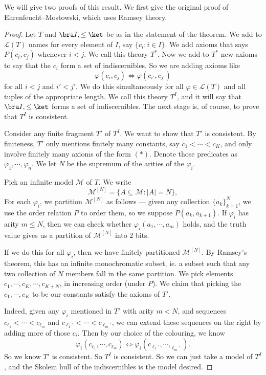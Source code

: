 \documentclass[a4paper]{article}
\begin{document}
We will give two proofs of this result. We first give the original proof of Ehrenfeucht--Mostowski, which uses Ramsey theory.
\begin{proof}
  Let $T$ and $\bra I, \leq \ket$ be as in the statement of the theorem. We add to $\mathcal{L}(T)$ names for every element of $I$, say $\{c_i: i \in I\}$. We add axioms that says $P(c_i, c_j)$ whenever $i < j$. We call this theory $T^*$. Now we add to $T^*$ new axioms to say that the $c_i$ form a set of indiscernibles. So we are adding axioms like
  \[
    \varphi(c_i, c_j) \Leftrightarrow \varphi(c_{i'}, c_{j'})\tag{$*$}
  \]
  for all $i < j$ and $i' < j'$. We do this simultaneously for all $\varphi \in \mathcal{L}(T)$ and all tuples of the appropriate length. We call this theory $T^I$, and it will say that $\bra I, \leq\ket$ forms a set of indiscernibles. The next stage is, of course, to prove that $T^I$ is consistent.

  Consider any finite fragment $T'$ of $T^I$. We want to show that $T'$ is consistent. By finiteness, $T'$ only mentions finitely many constants, say $c_1 < \cdots < c_K$, and only involve finitely many axioms of the form $(*)$. Denote those predicates as $\varphi_1, \cdots, \varphi_n$. We let $N$ be the supremum of the arities of the $\varphi_i$.

  Pick an infinite model $\mathcal{M}$ of $T$. We write
  \[
    \mathcal{M}^{[N]} = \{A \subseteq \mathcal{M}: |A| = N\},
  \]
  For each $\varphi_i$, we partition $\mathcal{M}^{[N]}$ as follows --- given any collection $\{a_k\}_{k = 1}^N$, we use the order relation $P$ to order them, so we suppose $P(a_k , a_{k + 1})$. If $\varphi_i$ has arity $m \leq N$, then we can check whether $\varphi_i(a_1, \cdots, a_m)$ holds, and the truth value gives us a partition of $\mathcal{M}^{[N]}$ into 2 bits.

  If we do this for all $\varphi_i$, then we have finitely partitioned $\mathcal{M}^{[N]}$. By Ramsey's theorem, this has an infinite monochromatic subset, ie. a subset such that any two collection of $N$ members fall in the same partition. We pick elements $c_1, \cdots, c_K, \cdots, c_{K + N}$, in increasing order (under $P$). We claim that picking the $c_1, \cdots, c_K$ to be our constants satisfy the axioms of $T'$.

  Indeed, given any $\varphi_i$ mentioned in $T'$ with arity $m < N$, and sequences $c_{\ell_1} < \cdots < c_{\ell_m}$ and $c_{\ell_1'} < \cdots < c_{\ell_m'}$, we can extend these sequences on the right by adding more of those $c_i$. Then by our choice of the colouring, we know
  \[
    \varphi_i(c_{\ell_1}, \cdots, c_{\ell_m}) \Leftrightarrow \varphi_i(c_{\ell_1'}, \cdots, _{\ell_m'}).
  \]
  So we know $T'$ is consistent. So $T^I$ is consistent. So we can just take a model of $T^I$, and the Skolem hull of the indiscernibles is the model desired.
\end{proof}
\end{document}
